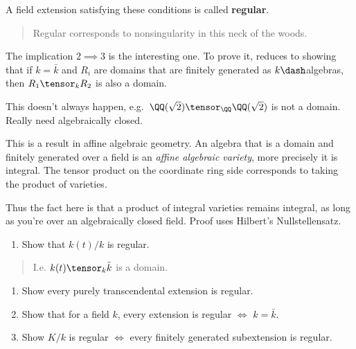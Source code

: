 A field extension satisfying these conditions is called
\textbf{regular}.

\begin{quote}
Regular corresponds to nonsingularity in this neck of the woods.
\end{quote}

\begin{remark}

The implication \(2\implies 3\) is the interesting one. To prove it,
reduces to showing that if \(k= \bar k\) and \(R_i\) are domains that
are finitely generated as \(k\dash\)algebras, then \(R_1 \tensor_k R_2\)
is also a domain.

This doesn't always happen,
e.g.~\(\QQ(\sqrt{2}) \tensor_\QQ \QQ(\sqrt{2})\) is not a domain. Really
need algebraically closed.

This is a result in affine algebraic geometry. An algebra that is a
domain and finitely generated over a field is an \emph{affine algebraic
variety}, more precisely it is integral. The tensor product on the
coordinate ring side corresponds to taking the product of varieties.

Thus the fact here is that a product of integral varieties remains
integral, as long as you're over an algebraically closed field. Proof
uses Hilbert's Nullstellensatz.

\end{remark}

\begin{exercise}

\hfill

\begin{enumerate}
\def\labelenumi{\alph{enumi}.}
\tightlist
\item
  Show that \(k(t) / k\) is regular.
\end{enumerate}

\begin{quote}
I.e. \(k(t)\tensor_k \bar k\) is a domain.
\end{quote}

\begin{enumerate}
\def\labelenumi{\alph{enumi}.}
\setcounter{enumi}{1}
\item
  Show every purely transcendental extension is regular.
\item
  Show that for a field \(k\), every extension is regular \(\iff\)
  \(k = \bar k\).
\item
  Show \(K/k\) is regular \(\iff\) every finitely generated subextension
  is regular.
\end{enumerate}

\end{exercise}

